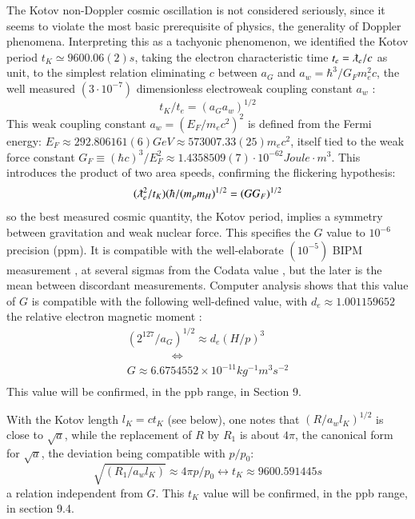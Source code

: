 \documentclass[twoside,draft]{article}
\begin{document}
\begin{sloppypar}
The Kotov non-Doppler cosmic oscillation \cite{Kotov1} is not considered seriously, since it seems to violate the most basic prerequisite of physics, the generality of Doppler phenomena. Interpreting this as a tachyonic phenomenon, we identified the Kotov period $t_{K} \simeq 9600.06(2) s$, taking the electron characteristic time $t_{e} = \lambdabar_{e} /c$ as unit, to the simplest relation eliminating $c$ between $a_{G}$ and $a_{w}=
\hbar^{3} /G_{F} m_{e}^{2} c$, the well measured $(3\cdot 10^{-7})$ dimensionless electroweak coupling constant $a_{w}$ :
\begin{equation}
t_{K} / t_{e} = (a_{G} a_{w})^{1/2}
\end{equation}
This weak coupling constant \cite{Carr} $a_{w} = (E_{F} /m_{e} c^{2} )^{2}$ is defined from the Fermi energy\cite{Tanabashi}: 
$
E_{F} \approx 292.806161(6) GeV \approx 573007.33(25) m_{e} c^{2}
$, itself tied to the weak force constant 
$
G_{F} \equiv (\hbar c)^{3} /E_{F}^{2} \approx
1.4358509(7) \cdot 10^{-62} Joule \cdot m^{3}
$. This introduces the product of two area speeds, confirming the flickering hypothesis:
\begin{equation}
(\lambdabar_{e}^2/t_{K} )(\hbar/(m_{p} m_{H})^{1/2} = (GG_{F})^{1/2}
\end{equation}
so the best measured cosmic quantity, the Kotov period, implies a symmetry between gravitation and weak nuclear force. This specifies the $G$ value to $10^{-6}$ precision (ppm). It is compatible with the well-elaborate $(10^{-5})$ BIPM measurement \cite{Quinn}, at several sigmas from the Codata value \cite{Tanabashi}, but the later is the mean between discordant measurements. Computer analysis shows that this value of $G$ is compatible with the following well-defined value, with $d_{e} \approx 1.001159652$ the relative electron magnetic moment\cite{Tanabashi} :
$$\begin{array}{ll}
(2^{127} /a_{G} )^{1/2} \approx d_{e} (H/p)^{3} \\
\qquad  \qquad \Leftrightarrow \\
G \approx 6.6754552 \times 10^{-11} kg^{-1} m^{3} s^{-2} \\
\end{array}$$
This value will be confirmed, in the ppb range, in Section 9.

With the Kotov length $l_{K} = ct_{K}$ (see below), one notes that $(R/a_w l_K)^{1/2} $ is close to $\sqrt{a}$, while the replacement of $R$ by $R_{1}$ is about $4\pi$, the canonical form for $\sqrt{a}$, the deviation being compatible with $p/p_{0}$:
$$\sqrt{(R_{1} /a_{w} l_{K})} \approx 4\pi p/p_{0} \leftrightarrow t_{K} \approx 9 600.591445 s$$ a relation independent from $G$. This $t_K$ value will be confirmed, in the ppb range, in section 9.4. 


\end{sloppypar}
\end{document}
